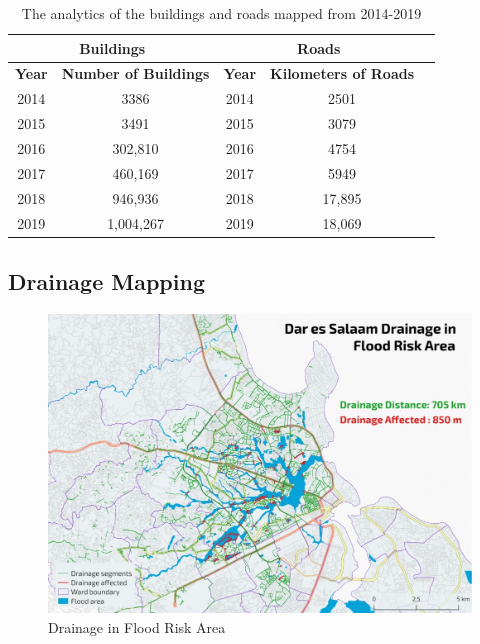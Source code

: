 \documentclass[a4paper,12pt,twoside]{article}
\begin{document}
\begin{table}[h!]
\begin{center}
\begin{tabular}{|c|c|c|c|c|}
\hline
\multicolumn{2}{|c|}{\bfseries Buildings} & \multicolumn{2}{|c|}{\bfseries Roads}\\
\hline
\bfseries Year & \bfseries Number of Buildings & \bfseries Year & \bfseries Kilometers of Roads\\
\hline
2014 & 3386 & 2014 & 2501\\
\hline
2015 & 3491 & 2015 & 3079\\
\hline
2016 & 302,810 & 2016 & 4754\\
\hline
2017 & 460,169 & 2017 & 5949\\
\hline
2018 & 946,936 & 2018 & 17,895\\
\hline
2019 & 1,004,267 & 2019 & 18,069\\
\hline
\end{tabular}
\caption{\label{tab:table-name}The analytics of the buildings and roads mapped from 2014-2019}
\end{center}
\end{table}

\newpage
\subsection{Drainage Mapping}
\begin{figure}[h]
    \centering
    \includegraphics[width=.8\textwidth]{images/drainmap_new.jpeg}
    \caption{Drainage in Flood Risk Area}
\end{figure}
\end{document}
